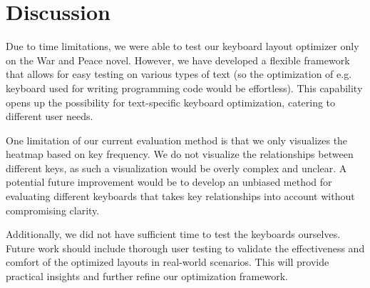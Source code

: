 \documentclass[9pt,twocolumn,twoside]{pnas-report}
\begin{document}
\section*{Discussion}

Due to time limitations, we were able to test our keyboard layout optimizer only on the War and Peace novel.
However, we have developed a flexible framework that allows for easy testing on various types of text (so the optimization of e.g. keyboard used for writing programming code would be effortless).
This capability opens up the possibility for text-specific keyboard optimization, catering to different user needs.

One limitation of our current evaluation method is that we only visualizes the heatmap based on key frequency.
We do not visualize the relationships between different keys, as such a visualization would be overly complex and unclear.
A potential future improvement would be to develop an unbiased method for evaluating different keyboards that takes key relationships into account without compromising clarity.

Additionally, we did not have sufficient time to test the keyboards ourselves.
Future work should include thorough user testing to validate the effectiveness and comfort of the optimized layouts in real-world scenarios.
This will provide practical insights and further refine our optimization framework.
\end{document}

